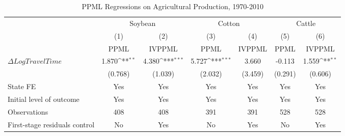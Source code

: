 \begin{table}[htbp]\centering
\def\sym#1{\ifmmode^{#1}\else\(^{#1}\)\fi}
\caption{PPML Regressions on Agricultural Production, 1970-2010}
\begin{tabular}{l*{6}{c}}
\hline\hline
                    &\multicolumn{2}{c}{Soybean}                &\multicolumn{2}{c}{Cotton}                 &\multicolumn{2}{c}{Cattle}                 \\\cmidrule(lr){2-3}\cmidrule(lr){4-5}\cmidrule(lr){6-7}
                    &\multicolumn{1}{c}{(1)}         &\multicolumn{1}{c}{(2)}         &\multicolumn{1}{c}{(3)}         &\multicolumn{1}{c}{(4)}         &\multicolumn{1}{c}{(5)}         &\multicolumn{1}{c}{(6)}         \\
                    &        PPML         &      IVPPML         &        PPML         &      IVPPML         &        PPML         &      IVPPML         \\
\hline
$\Delta Log Travel Time$&       1.870\sym{**} &       4.380\sym{***}&       5.727\sym{***}&       3.660         &      -0.113         &       1.559\sym{**} \\
                    &     (0.768)         &     (1.039)         &     (2.032)         &     (3.459)         &     (0.291)         &     (0.606)         \\
\hline
State FE            &         Yes         &         Yes         &         Yes         &         Yes         &         Yes         &         Yes         \\
Initial level of outcome&         Yes         &         Yes         &         Yes         &         Yes         &         Yes         &         Yes         \\
Observations        &         408         &         408         &         391         &         391         &         528         &         528         \\
First-stage residuals control&          No         &         Yes         &          No         &         Yes         &          No         &         Yes         \\
\hline\hline
\end{tabular}
\end{table}
